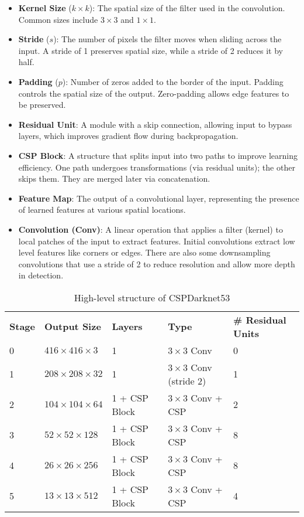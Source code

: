 \documentclass[11pt]{article}
\begin{document}
\begin{itemize}
    \item \textbf{Kernel Size} (\( k \times k \)): The spatial size of the filter used in the convolution. Common sizes include \(3 \times 3\) and \(1 \times 1\).
    \item \textbf{Stride} (\(s\)): The number of pixels the filter moves when sliding across the input. A stride of 1 preserves spatial size, while a stride of 2 reduces it by half.
    \item \textbf{Padding} (\(p\)): Number of zeros added to the border of the input. Padding controls the spatial size of the output. Zero-padding allows edge features to be preserved.
    \item \textbf{Residual Unit}: A module with a skip connection, allowing input to bypass layers, which improves gradient flow during backpropagation.
    \item \textbf{CSP Block}: A structure that splits input into two paths to improve learning efficiency. One path undergoes transformations (via residual units); the other skips them. They are merged later via concatenation.
    \item \textbf{Feature Map}: The output of a convolutional layer, representing the presence of learned features at various spatial locations.
    \item \textbf{Convolution (Conv)}: A linear operation that applies a filter (kernel) to local patches of the input to extract features. Initial convolutions extract low level features like corners or edges. There are also some downsampling convolutions that use a stride of 2 to reduce resolution and allow more depth in detection.
\end{itemize}

\begin{table}[h!]
\centering
\begin{tabular}{@{}lllll@{}}

\textbf{Stage} & \textbf{Output Size} & \textbf{Layers} & \textbf{Type} & \textbf{\# Residual Units} \\
0 & $416 \times 416 \times 3$ & 1 & $3 \times 3$ Conv & 0 \\
1 & $208 \times 208 \times 32$ & 1 & $3 \times 3$ Conv (stride 2) & 1 \\
2 & $104 \times 104 \times 64$ & 1 + CSP Block & $3 \times 3$ Conv + CSP & 2 \\
3 & $52 \times 52 \times 128$ & 1 + CSP Block & $3 \times 3$ Conv + CSP & 8 \\
4 & $26 \times 26 \times 256$ & 1 + CSP Block & $3 \times 3$ Conv + CSP & 8 \\
5 & $13 \times 13 \times 512$ & 1 + CSP Block & $3 \times 3$ Conv + CSP & 4 \\
\end{tabular}
\caption{High-level structure of CSPDarknet53}
\end{table} \cite{glenn2020yolov5}
\end{document}
